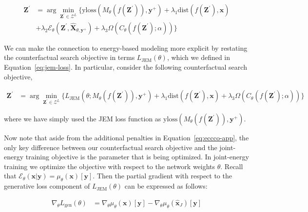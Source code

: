 \begin{equation} \label{eq:eccco-app}
  \begin{aligned}
  \mathbf{Z}^\prime &= \arg \min_{\mathbf{Z}^\prime \in \mathcal{Z}^L} \{  {\text{yloss}(M_{\theta}(f(\mathbf{Z}^\prime)),\mathbf{y}^+)}+ \lambda_{1} {\text{dist}(f(\mathbf{Z}^\prime),\mathbf{x}) } \\
  &+ \lambda_2 \mathcal{E}_{\theta}(\mathbf{Z}^\prime,\widehat{\mathbf{X}}_{\theta,\mathbf{y}^+}) + \lambda_3 \Omega(C_{\theta}(f(\mathbf{Z}^\prime);\alpha)) \} 
  \end{aligned} 
\end{equation}

We can make the connection to energy-based modeling more explicit by restating the counterfactual search objective in terms $L_{\text{JEM}}(\theta)$, which we defined in Equation~\ref{eq:jem-loss}. In particular, consider the following counterfactual search objective,

\begin{equation} \label{eq:eccco-jem}
  \begin{aligned}
  \mathbf{Z}^\prime &= \arg \min_{\mathbf{Z}^\prime \in \mathcal{Z}^L} \{  {L_{\text{JEM}}(\theta;M_{\theta}(f(\mathbf{Z}^\prime)),\mathbf{y}^+)}+ \lambda_{1} {\text{dist}(f(\mathbf{Z}^\prime),\mathbf{x}) }  + \lambda_3 \Omega(C_{\theta}(f(\mathbf{Z}^\prime);\alpha)) \} 
  \end{aligned} 
\end{equation}

where we have simply used the JEM loss function as $\text{yloss}(M_{\theta}(f(\mathbf{Z}^\prime)),\mathbf{y}^+)$.

Now note that aside from the additional penalties in Equation~\ref{eq:eccco-app}, the only key difference between our counterfactual search objective and the joint-energy training objective is the parameter that is being optimized. In joint-energy training we optimize the objective with respect to the network weights $\theta$. Recall that $\mathcal{E}_{\theta}(\mathbf{x}|\mathbf{y})=\mu_{\theta}(\mathbf{x})[\mathbf{y}]$. Then the partial gradient with respect to the generative loss component of $L_{\text{JEM}}(\theta)$ can be expressed as follows:

\begin{equation}\label{eq:jem-grad}
  \begin{aligned}
    \nabla_{\theta}L_{\text{gen}}(\theta) &= \nabla_{\theta}\mu_{\theta}(\mathbf{x})[\mathbf{y}]- \nabla_{\theta}\mu_{\theta}(\hat{\mathbf{x}}_{J})[\mathbf{y}]
  \end{aligned}
\end{equation}

